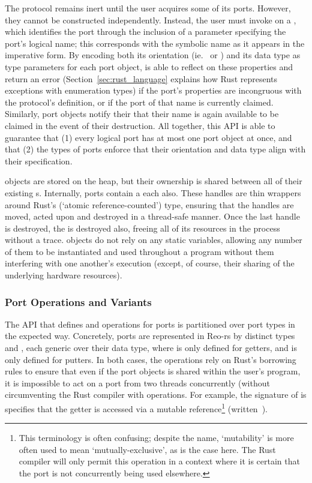 The protocol remains inert until the user acquires some of its ports. However, they cannot be constructed independently. Instead, the user must invoke  on a , which identifies the port through the inclusion of a parameter specifying the port's logical name; this corresponds with the symbolic name as it appears in the imperative form. By encoding both its orientation (ie.\  or ) and its data type as type parameters for each port object,  is able to reflect on these properties and return an error (Section~\ref{sec:rust_language} explains how Rust represents exceptions with enumeration types) if the port's properties are incongruous with the protocol's definition, or if the port of that name is currently claimed. Similarly, port objects notify their  that their name is again available to be claimed in the event of their destruction. All together, this API is able to guarantee that (1) every logical port has at most one port object at once, and that (2) the types of ports enforce that their orientation and data type align with their specification.

 objects are stored on the heap, but their ownership is shared between all of their existing s. Internally, ports contain a  each also. These handles are thin wrappers around Rust's  (`atomic reference-counted') type, ensuring that the handles are moved, acted upon and destroyed in a thread-safe manner. Once the last handle is destroyed, the  is destroyed also, freeing all of its resources in the process without a trace.  objects do not rely on any static variables, allowing any number of them to be instantiated and used throughout a program without them interfering with one another's execution (except, of course, their sharing of the underlying hardware resources). 

\subsubsection{Port Operations and Variants}
\label{sec:port_operations}
The API that defines  and  operations for ports is partitioned over port types in the expected way. Concretely, ports are represented in Reo-rs by distinct types  and , each generic over their data type, where  is only defined for getters, and  is only defined for putters. In both cases, the operations rely on Rust's borrowing rules to ensure that even if the port objects is shared within the user's program, it is impossible to act on a port from two threads concurrently (without circumventing the Rust compiler with  operations. For example, the signature of  is specifies that the getter is accessed via a mutable reference\footnote{This terminology is often confusing; despite the name, `mutability' is more often used to mean `mutually-exclusive', as is the case here. The Rust compiler will only permit this operation in a context where it is certain that the port is not concurrently being used elsewhere.} (written~).

